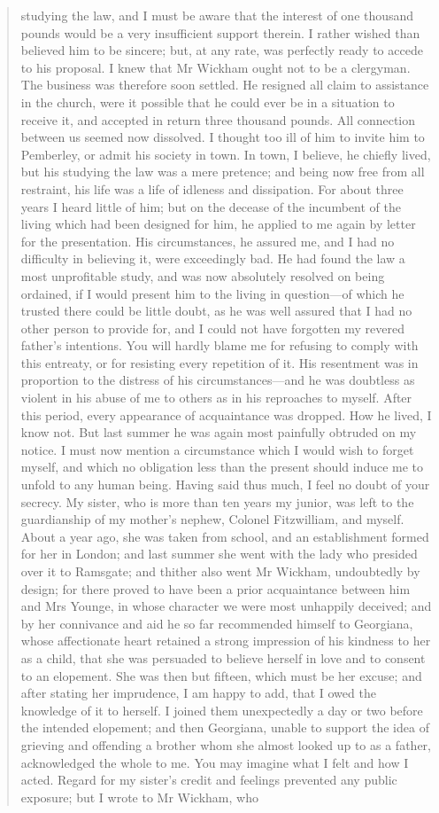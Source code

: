 \begin{quotation}
studying the law, and I must be aware that the interest of one thousand pounds would be a very insufficient support therein. I rather wished than believed him to be sincere; but, at any rate, was perfectly ready to accede to his proposal. I knew that Mr Wickham ought not to be a clergyman. The business was therefore soon settled. He resigned all claim to assistance in the church, were it possible that he could ever be in a situation to receive it, and accepted in return three thousand pounds. All connection between us seemed now dissolved. I thought too ill of him to invite him to Pemberley, or admit his society in town. In town, I believe, he chiefly lived, but his studying the law was a mere pretence; and being now free from all restraint, his life was a life of idleness and dissipation. For about three years I heard little of him; but on the decease of the incumbent of the living which had been designed for him, he applied to me again by letter for the presentation. His circumstances, he assured me, and I had no difficulty in believing it, were exceedingly bad. He had found the law a most unprofitable study, and was now absolutely resolved on being ordained, if I would present him to the living in question—of which he trusted there could be little doubt, as he was well assured that I had no other person to provide for, and I could not have forgotten my revered father's intentions. You will hardly blame me for refusing to comply with this entreaty, or for resisting every repetition of it. His resentment was in proportion to the distress of his circumstances—and he was doubtless as violent in his abuse of me to others as in his reproaches to myself. After this period, every appearance of acquaintance was dropped. How he lived, I know not. But last summer he was again most painfully obtruded on my notice. I must now mention a circumstance which I would wish to forget myself, and which no obligation less than the present should induce me to unfold to any human being. Having said thus much, I feel no doubt of your secrecy. My sister, who is more than ten years my junior, was left to the guardianship of my mother's nephew, Colonel Fitzwilliam, and myself. About a year ago, she was taken from school, and an establishment formed for her in London; and last summer she went with the lady who presided over it to Ramsgate; and thither also went Mr Wickham, undoubtedly by design; for there proved to have been a prior acquaintance between him and Mrs Younge, in whose character we were most unhappily deceived; and by her connivance and aid he so far recommended himself to Georgiana, whose affectionate heart retained a strong impression of his kindness to her as a child, that she was persuaded to believe herself in love and to consent to an elopement. She was then but fifteen, which must be her excuse; and after stating her imprudence, I am happy to add, that I owed the knowledge of it to herself. I joined them unexpectedly a day or two before the intended elopement; and then Georgiana, unable to support the idea of grieving and offending a brother whom she almost looked up to as a father, acknowledged the whole to me. You may imagine what I felt and how I acted. Regard for my sister's credit and feelings prevented any public exposure; but I wrote to Mr Wickham, who 
\end{quotation}
